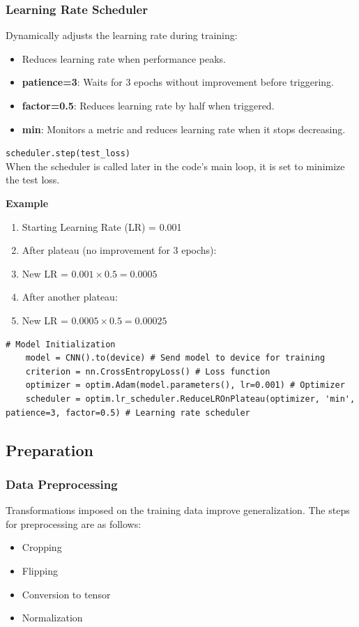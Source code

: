 \subsubsection{Learning Rate Scheduler}
Dynamically adjusts the learning rate during training:
\begin{itemize}[noitemsep]
    \item Reduces learning rate when performance peaks.
    \item \textbf{patience=3}: Waits for 3 epochs without improvement before triggering.
    \item \textbf{factor=0.5}: Reduces learning rate by half when triggered.
    \item \textbf{min}: Monitors a metric and reduces learning rate when it stops decreasing.
\end{itemize}

\texttt{scheduler.step(test\_loss)} \\ 
When the scheduler is called later in the code's main loop, it is set to minimize the test loss.

\textbf{Example}
\begin{enumerate}[noitemsep]
    \item Starting Learning Rate (LR) = 0.001
    \item After plateau (no improvement for 3 epochs):
    \item New LR = $0.001 \times 0.5 = 0.0005$
    \item After another plateau:
    \item New LR = $0.0005 \times 0.5 = 0.00025$
\end{enumerate}

\begin{lstlisting}[caption={Model Initialization}, label={lst:model_init}]
    # Model Initialization
    model = CNN().to(device) # Send model to device for training
    criterion = nn.CrossEntropyLoss() # Loss function
    optimizer = optim.Adam(model.parameters(), lr=0.001) # Optimizer
    scheduler = optim.lr_scheduler.ReduceLROnPlateau(optimizer, 'min', patience=3, factor=0.5) # Learning rate scheduler
\end{lstlisting}

\subsection{Preparation}

\subsubsection{Data Preprocessing}
Transformations imposed on the training data improve generalization. The steps for preprocessing 
are as follows:
\begin{itemize}[noitemsep]
    \item Cropping
    \item Flipping
    \item Conversion to tensor
    \item Normalization
\end{itemize}

